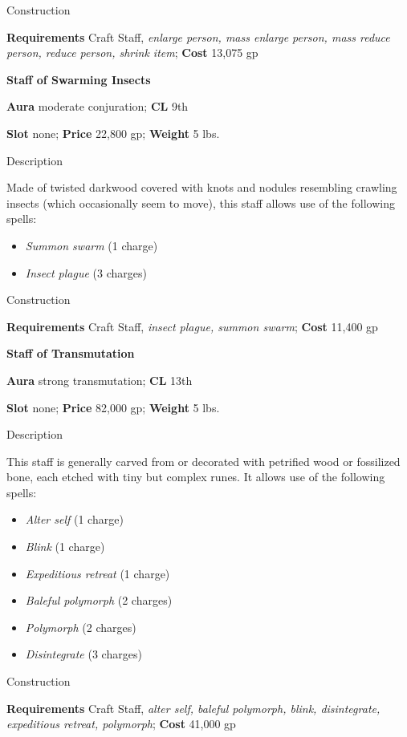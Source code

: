 Construction
				
\textbf{Requirements }Craft Staff, \textit{enlarge person, mass enlarge person, mass reduce person, reduce person, shrink item}; \textbf{Cost} 13,075 gp
				
\textbf{Staff of Swarming Insects}
				
\textbf{Aura} moderate conjuration;\textbf{ CL }9th
				
\textbf{Slot} none; \textbf{Price} 22,800 gp; \textbf{Weight} 5 lbs.
				
Description
				
Made of twisted darkwood covered with knots and nodules resembling crawling insects (which occasionally seem to move), this staff allows use of the following spells:
				\begin{itemize}\item  \textit{Summon swarm} (1 charge)
				\item  \textit{Insect plague} (3 charges) 
\end{itemize}
				
Construction
				
\textbf{Requirements} Craft Staff, \textit{insect plague, summon swarm}; \textbf{Cost }11,400 gp
				
\textbf{Staff of Transmutation}
				
\textbf{Aura} strong transmutation; \textbf{CL} 13th
				
\textbf{Slot} none; \textbf{Price} 82,000 gp; \textbf{Weight} 5 lbs.
				
Description
				
This staff is generally carved from or decorated with petrified wood or fossilized bone, each etched with tiny but complex runes. It allows use of the following spells:
				\begin{itemize}\item  \textit{Alter self} (1 charge)
				\item  \textit{Blink} (1 charge)
				\item  \textit{Expeditious retreat} (1 charge)
				\item  \textit{Baleful polymorph} (2 charges)
				\item  \textit{Polymorph} (2 charges)
				\item  \textit{Disintegrate} (3 charges) 
\end{itemize}
				
Construction
				
\textbf{Requirements} Craft Staff, \textit{alter self, baleful polymorph, blink, disintegrate, expeditious retreat, polymorph}; \textbf{Cost }41,000 gp
				

